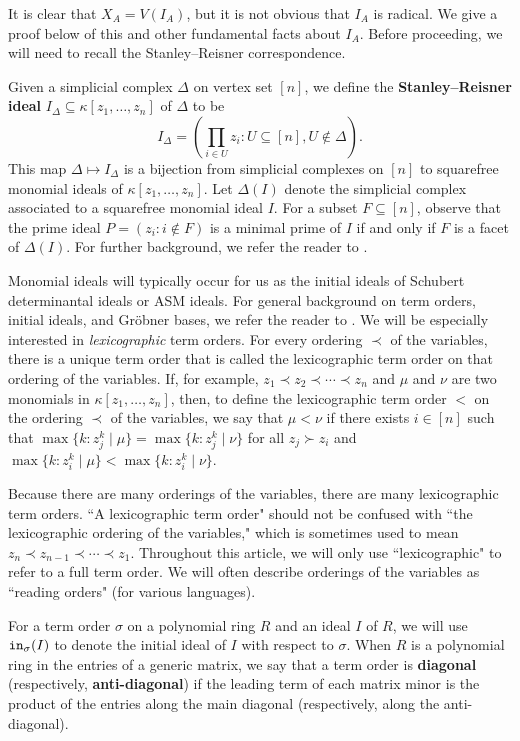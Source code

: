 \documentclass[12pt,reqno]{amsart}
\newtheorem{Main Conjecture}[theorem]{Main Conjecture}
\theoremstyle{remark}
\theoremstyle{plain}
\newcommand{\mydef}[1]{{\bf #1}}
\newcommand{\init}{{\tt in}}
\begin{document}
It is clear that $X_A=V(I_A)$, but it is not obvious that $I_A$ is radical.  We give a proof below of this and other fundamental facts about $I_A$. Before proceeding, we will need to recall the Stanley--Reisner correspondence.

Given a simplicial complex $\Delta$ on vertex set $[n]$, we define the \mydef{Stanley--Reisner ideal} $I_{\Delta}\subseteq \kappa[z_1,\dots, z_n]$ of $\Delta$ to be  
\[ I_\Delta = \left( \prod_{i \in U} z_i : U \subseteq [n], U \notin \Delta \right).\]  This map $\Delta\mapsto I_\Delta$ is a bijection from simplicial complexes on $[n]$ to squarefree monomial ideals of $\kappa[z_1,\dots, z_n]$. Let $\Delta(I)$ denote the simplicial complex associated to a squarefree monomial ideal $I$. For a subset $F \subseteq [n]$, observe that the prime ideal $P = (z_i : i \notin F)$ is a minimal prime of $I$ if and only if $F$ is a facet of $\Delta(I)$.  For further background, we refer the reader to \cite[Chapter 1]{MS04}.


Monomial ideals will typically occur for us as the initial ideals of Schubert determinantal ideals or ASM ideals.  For general background on term orders, initial ideals, and Gr\"obner bases, we refer the reader to \cite[Chapter 15]{Eis95}.   We will be especially interested in \emph{lexicographic} term orders.  For every ordering $\prec$ of the variables, there is a unique term order that is called the lexicographic term order on that ordering of the variables.  If, for example, $z_1 \prec z_2 \prec \cdots \prec z_n$ and $\mu$ and $\nu$ are two monomials in $\kappa[z_1, \ldots, z_n]$, then, to define the lexicographic term order $<$ on the ordering $\prec$ of the variables, we say that $\mu <\nu$ if there exists $i\in [n]$ such that $\max \{ k: z_j^k \mid \mu\} = \max\{ k: z_j^k \mid \nu\}$ for all $z_j \succ z_i$ and $\max\{k: z_i^k \mid \mu\} < \max\{ k: z_i^k \mid \nu\}$.  


Because there are many orderings of the variables, there are many lexicographic term orders.  ``A lexicographic term order" should not be confused with ``the lexicographic ordering of the variables," which is sometimes used to mean $z_n \prec z_{n-1} \prec \cdots \prec z_1$.  Throughout this article, we will only use ``lexicographic" to refer to a full term order.  We will often describe orderings of the variables as ``reading orders" (for various languages).

For a term order $\sigma$ on a polynomial ring $R$ and an ideal $I$ of $R$, we will use $\init_\sigma(I)$ to denote the initial ideal of $I$ with respect to $\sigma$.  When $R$ is a polynomial ring in the entries of a generic matrix, we say that a term order is \mydef{diagonal} (respectively, \mydef{anti-diagonal}) if the leading term of each matrix minor is the product of the entries along the main diagonal (respectively, along the anti-diagonal).  
\end{document}
